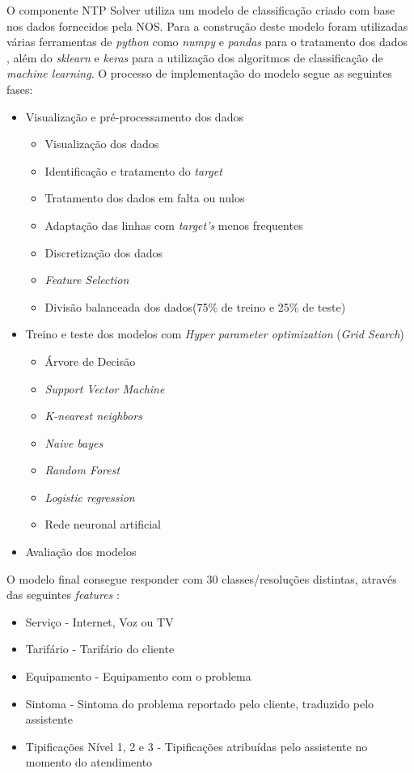\documentclass[11pt,a4paper]{article}
\begin{document}
O componente NTP Solver utiliza um modelo de classificação criado com base nos dados fornecidos pela NOS.
Para a construção deste modelo foram utilizadas várias ferramentas de \textit{python} como \textit{numpy} e
\textit{pandas} para o tratamento dos dados , além do \textit{sklearn} e \textit{keras} para a utilização
dos algoritmos de classificação de \textit{machine learning}.  O processo de implementação do modelo segue
as seguintes fases:
\begin{itemize}
    \item Visualização e pré-processamento dos dados
    \begin{itemize}
        \item Visualização dos dados
        \item Identificação e tratamento do \textit{target}
        \item Tratamento dos dados em falta ou nulos
        \item Adaptação das linhas com \textit{target's} menos frequentes
        \item Discretização dos dados
        \item \textit{Feature Selection}
        \item Divisão balanceada dos dados(75\% de treino e 25\% de teste)
    \end{itemize}
    \item Treino e teste dos modelos  com \textit{Hyper parameter optimization} (\textit{Grid Search})
    \begin{itemize}
        \item Árvore de Decisão
        \item \textit{Support Vector Machine}
        \item \textit{K-nearest neighbors}
        \item \textit{Naive bayes}
        \item \textit{Random Forest}
        \item \textit{Logistic regression}
        \item Rede neuronal artificial
    \end{itemize}
    \item Avaliação dos modelos
\end{itemize}
O modelo final consegue responder com 30 classes/resoluções distintas, através das seguintes \textit{features} :
\begin{itemize}
    \item Serviço -  Internet, Voz ou TV
    \item Tarifário -  Tarifário do cliente
    \item Equipamento -  Equipamento com o problema
    \item Sintoma -  Sintoma do problema reportado pelo cliente, traduzido pelo assistente
    \item Tipificações Nível 1, 2 e 3 - Tipificações atribuídas pelo assistente no momento do atendimento
\end{itemize}
\end{document}
